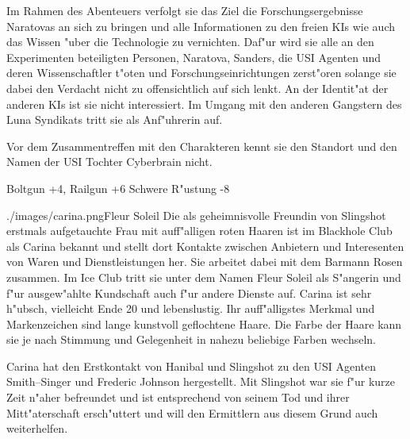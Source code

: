Im Rahmen des Abenteuers verfolgt sie das Ziel die Forschungsergebnisse Naratovas an sich zu bringen und alle Informationen zu den freien KIs wie auch das Wissen "uber die Technologie zu vernichten. Daf"ur wird sie alle an den Experimenten beteiligten Personen, Naratova, Sanders, die USI Agenten und deren Wissenschaftler t"oten und Forschungseinrichtungen zerst"oren solange sie dabei den Verdacht nicht zu offensichtlich auf sich lenkt. An der Identit"at der anderen KIs ist sie nicht interessiert. Im Umgang mit den anderen  Gangstern des Luna Syndikats tritt sie als Anf"uhrerin auf.

Vor dem Zusammentreffen mit den Charakteren kennt sie den Standort und den Namen der USI Tochter Cyberbrain nicht.

\begin{nscsheet}[f]{\xls}
    \nscstats[ATT=9,AGG=10,EMP=4,KNO=4,HP=14]
    \nscruler
    \begin{nscinventory}
        \nscitem[Waffen] Boltgun +4, Railgun +6
        \nscitem[R"ustung] Schwere R"ustung -8
    \end{nscinventory}
\end{nscsheet}



\begin{sideimagebox}[r]{0.5}{./images/carina.png}{Fleur Soleil}
    Die als geheimnisvolle Freundin von Slingshot erstmals aufgetauchte Frau mit auff"alligen roten Haaren ist im Blackhole Club als Carina bekannt und stellt dort Kontakte zwischen Anbietern und Interesenten von Waren und Dienstleistungen her. Sie arbeitet dabei mit dem Barmann Rosen zusammen. Im Ice Club tritt sie unter dem Namen Fleur Soleil als S"angerin und f"ur ausgew"ahlte Kundschaft auch f"ur andere Dienste auf. Carina ist sehr h"ubsch, vielleicht Ende 20 und lebenslustig. Ihr auff"alligstes Merkmal und Markenzeichen sind lange kunstvoll geflochtene Haare. Die Farbe der Haare kann sie je nach Stimmung und Gelegenheit in nahezu beliebige Farben wechseln.

    Carina hat den Erstkontakt von Hanibal und Slingshot zu den USI Agenten Smith--Singer und Frederic Johnson hergestellt. Mit Slingshot war sie f"ur kurze Zeit n"aher befreundet und ist entsprechend von seinem Tod und ihrer Mitt"aterschaft ersch"uttert und will den Ermittlern aus diesem Grund auch weiterhelfen.
\end{sideimagebox}


